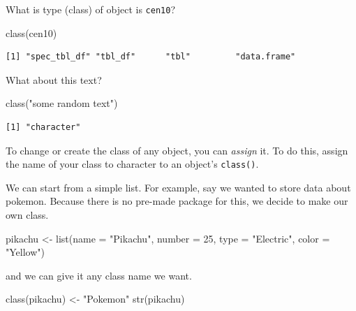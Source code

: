 \documentclass[
  letterpaper,
]{book}
\newenvironment{Shaded}{\begin{snugshade}}{\end{snugshade}}
\newcommand{\AttributeTok}[1]{\textcolor[rgb]{0.40,0.45,0.13}{#1}}
\newcommand{\DecValTok}[1]{\textcolor[rgb]{0.68,0.00,0.00}{#1}}
\newcommand{\FunctionTok}[1]{\textcolor[rgb]{0.28,0.35,0.67}{#1}}
\newcommand{\NormalTok}[1]{\textcolor[rgb]{0.00,0.23,0.31}{#1}}
\newcommand{\OtherTok}[1]{\textcolor[rgb]{0.00,0.23,0.31}{#1}}
\newcommand{\StringTok}[1]{\textcolor[rgb]{0.13,0.47,0.30}{#1}}
\theoremstyle{definition}
\theoremstyle{definition}
\theoremstyle{plain}
\theoremstyle{definition}
\theoremstyle{plain}
\theoremstyle{plain}
\theoremstyle{remark}
\begin{document}
What is type (class) of object is \texttt{cen10}?

\begin{Shaded}
\begin{Highlighting}[]
\FunctionTok{class}\NormalTok{(cen10)}
\end{Highlighting}
\end{Shaded}

\begin{verbatim}
[1] "spec_tbl_df" "tbl_df"      "tbl"         "data.frame" 
\end{verbatim}

What about this text?

\begin{Shaded}
\begin{Highlighting}[]
\FunctionTok{class}\NormalTok{(}\StringTok{"some random text"}\NormalTok{)}
\end{Highlighting}
\end{Shaded}

\begin{verbatim}
[1] "character"
\end{verbatim}

To change or create the class of any object, you can \emph{assign} it.
To do this, assign the name of your class to character to an object's
\texttt{class()}.

We can start from a simple list. For example, say we wanted to store
data about pokemon. Because there is no pre-made package for this, we
decide to make our own class.

\begin{Shaded}
\begin{Highlighting}[]
\NormalTok{pikachu }\OtherTok{\textless{}{-}} \FunctionTok{list}\NormalTok{(}\AttributeTok{name =} \StringTok{"Pikachu"}\NormalTok{,}
                \AttributeTok{number =} \DecValTok{25}\NormalTok{,}
                \AttributeTok{type =} \StringTok{"Electric"}\NormalTok{,}
                \AttributeTok{color =} \StringTok{"Yellow"}\NormalTok{)}
\end{Highlighting}
\end{Shaded}

and we can give it any class name we want.

\begin{Shaded}
\begin{Highlighting}[]
\FunctionTok{class}\NormalTok{(pikachu) }\OtherTok{\textless{}{-}} \StringTok{"Pokemon"}
\FunctionTok{str}\NormalTok{(pikachu)}
\end{Highlighting}
\end{Shaded}
\end{document}

